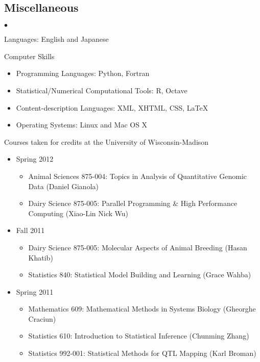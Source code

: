 \documentclass[margin,line,10pt]{res}
\newenvironment{list2}{
  \begin{list}{$\bullet$}{%
      \setlength{\itemsep}{0in}
      \setlength{\parsep}{0in} \setlength{\parskip}{0in}
      \setlength{\topsep}{0in} \setlength{\partopsep}{0in} 
      \setlength{\leftmargin}{0.2in}}}{\end{list}}
\begin{document}
\begin{resume}
\section{\sc Miscellaneous} 
\begin{list2}
\item Languages: English and Japanese
  \vspace{0.2cm}
\item Computer Skills 
  \begin{itemize}
    \item Programming Languages: Python, Fortran
    \item Statistical/Numerical Computational  Tools: R, Octave
    \item Content-description Languages: XML, XHTML, CSS, \LaTeX
    \item Operating Systems: Linux and Mac OS X
  \end{itemize}
    \vspace{0.2cm}
\item Courses taken for credits at the University of Wisconsin-Madison 
  \begin{itemize}

\item Spring 2012
\begin{itemize}
\item    Animal Sciences 875-004: Topics in Analysis of Quantitative Genomic Data (Daniel Gianola)
\item    Dairy Science 875-005: Parallel Programming \& High Performance Computing (Xiao-Lin Nick Wu)
\end{itemize}


\item Fall 2011
\begin{itemize}
\item    Dairy Science 875-005: Molecular Aspects of Animal Breeding (Hasan Khatib)
\item    Statistics 840: Statistical Model Building and Learning (Grace Wahba)
\end{itemize}



\item Spring 2011
\begin{itemize}
\item    Mathematics 609: Mathematical Methods in Systems Biology (Gheorghe Craciun)
\item    Statistics 610: Introduction to Statistical Inference (Chunming Zhang)
\item    Statistics 992-001: Statistical Methods for QTL Mapping (Karl Broman)
\end{itemize}



\end{itemize}
\end{list2}
\end{resume}
\end{document}
